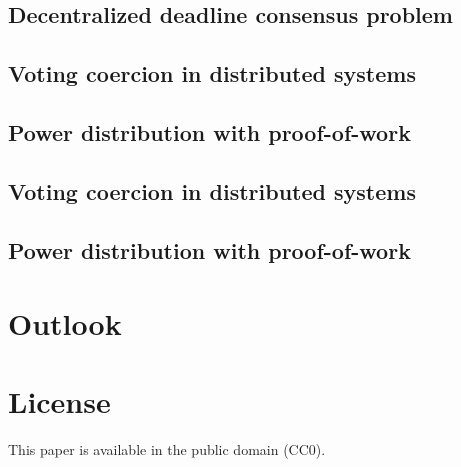 \documentclass[9pt,oneside]{amsart}
\begin{document}
\begin{multicols}{2}
\subsection{Decentralized deadline consensus problem}

\subsection{Voting coercion in distributed systems}



\subsection{Power distribution with proof-of-work}

\subsection{Voting coercion in distributed systems}

\subsection{Power distribution with proof-of-work}

\section{Outlook}

\section{License}
This paper is available in the public domain (CC0).


\end{multicols}
\end{document}
